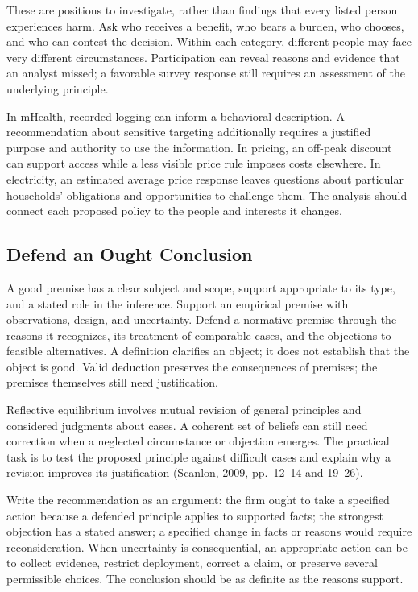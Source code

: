 These are positions to investigate, rather than findings that every
listed person experiences harm. Ask who receives a benefit, who bears a
burden, who chooses, and who can contest the decision. Within each
category, different people may face very different circumstances.
Participation can reveal reasons and evidence that an analyst missed; a
favorable survey response still requires an assessment of the underlying
principle.

In mHealth, recorded logging can inform a behavioral description. A
recommendation about sensitive targeting additionally requires a
justified purpose and authority to use the information. In pricing, an
off-peak discount can support access while a less visible price rule
imposes costs elsewhere. In electricity, an estimated average price
response leaves questions about particular households' obligations and
opportunities to challenge them. The analysis should connect each
proposed policy to the people and interests it changes.

\hypertarget{M09-defend-an-ought-conclusion}{%
\subsection{Defend an Ought
Conclusion}\label{M09-defend-an-ought-conclusion}}

\noindent \noindent A good premise has a clear subject and scope, support
appropriate to its type, and a stated role in the inference. Support an
empirical premise with observations, design, and uncertainty. Defend a
normative premise through the reasons it recognizes, its treatment of
comparable cases, and the objections to feasible alternatives. A
definition clarifies an object; it does not establish that the object is
good. Valid deduction preserves the consequences of premises; the
premises themselves still need justification.

Reflective equilibrium involves mutual revision of general principles
and considered judgments about cases. A coherent set of beliefs can
still need correction when a neglected circumstance or objection
emerges. The practical task is to test the proposed principle against
difficult cases and explain why a revision improves its justification
\href{https://media.philosophy.ox.ac.uk/assets/pdf_file/0010/25858/Lecture_4.pdf}{(Scanlon,
2009, pp.~12--14 and 19--26)}.

Write the recommendation as an argument: the firm ought to take a
specified action because a defended principle applies to supported
facts; the strongest objection has a stated answer; a specified change
in facts or reasons would require reconsideration. When uncertainty is
consequential, an appropriate action can be to collect evidence,
restrict deployment, correct a claim, or preserve several permissible
choices. The conclusion should be as definite as the reasons support.

